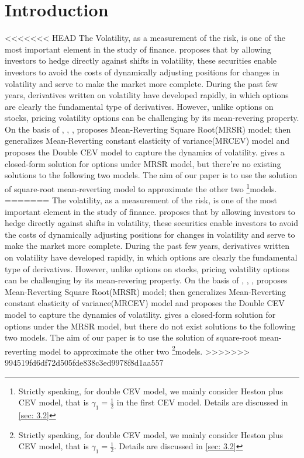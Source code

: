 \chapter{Introduction}

<<<<<<< HEAD
The Volatility, as a measurement of the risk, is one of the most important element in the study of finance. \cite{whaley_derivatives_1993} proposes that by allowing investors to hedge directly against shifts in volatility, these securities enable investors to avoid the costs of dynamically adjusting positions for changes in volatility and serve to make the market more complete. During the past few years, derivatives written on volatility have developed rapidly, in which options are clearly the fundamental type of derivatives. However, unlike options on stocks, pricing volatility options can be challenging by its mean-revering property. On the basis of \cite{cox_theory_1985}, \cite{hull_pricing_1987}, \cite{heston_closed-form_1993}, \cite{grunbichler_valuing_1996} proposes Mean-Reverting Square Root(MRSR) model; \cite{chan_empirical_1992} then generalizes Mean-Reverting constant elasticity of variance(MRCEV) model and \cite{gatheral_consistent_2008} proposes the Double CEV model to capture the dynamics of volatility. \cite{grunbichler_valuing_1996} gives a closed-form solution for options under MRSR model, but there're no existing solutions to the following two models. The aim of our paper is to use the solution of square-root mean-reverting model to approximate the other two \footnote{Strictly speaking, for double CEV model, we mainly consider Heston plus CEV model, that is $\gamma_1=\frac{1}{2}$ in the first CEV model. Details are discussed in \ref{sec: 3.2}}{models}.
=======
The volatility, as a measurement of the risk, is one of the most important element in the study of finance. \cite{whaley_derivatives_1993} proposes that by allowing investors to hedge directly against shifts in volatility, these securities enable investors to avoid the costs of dynamically adjusting positions for changes in volatility and serve to make the market more complete. During the past few years, derivatives written on volatility have developed rapidly, in which options are clearly the fundamental type of derivatives. However, unlike options on stocks, pricing volatility options can be challenging by its mean-revering property. On the basis of \cite{cox_theory_1985}, \cite{hull_pricing_1987}, \cite{heston_closed-form_1993}, \cite{grunbichler_valuing_1996} proposes Mean-Reverting Square Root(MRSR) model; \cite{chan_empirical_1992} then generalizes Mean-Reverting constant elasticity of variance(MRCEV) model and \cite{gatheral_consistent_2008} proposes the Double CEV model to capture the dynamics of volatility. \cite{grunbichler_valuing_1996} gives a closed-form solution for options under the MRSR model, but there do not exist solutions to the following two models. The aim of our paper is to use the solution of square-root mean-reverting model to approximate the other two \footnote{Strictly speaking, for double CEV model, we mainly consider Heston plus CEV model, that is $\gamma_1=\frac{1}{2}$. Details are discussed in \ref{sec: 3.2}}{models}.
>>>>>>> 994519fd6df72d505fde838c3ed9978f8d1aa557

